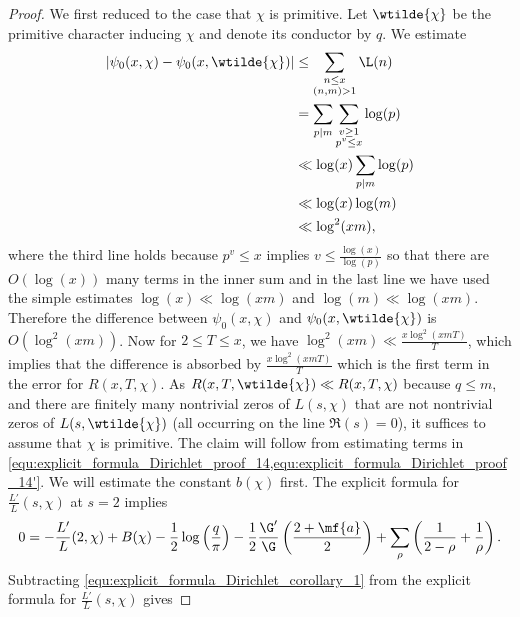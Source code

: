       \begin{proof}
        We first reduced to the case that $\chi$ is primitive. Let $\wtilde{\chi}$ be the primitive character inducing $\chi$ and denote its conductor by $q$. We estimate
        \begin{equation}\label{equ:difference_between_Dirichlet-Chebychefs}
          \begin{aligned}
            |\psi_{0}(x,\chi)-\psi_{0}(x,\wtilde{\chi})| &\le \sum_{\substack{n \le x \\ (n,m) > 1}}\L(n) \\
            &= \sum_{p \mid m}\sum_{\substack{v \ge 1 \\ p^{v} \le x}}\log(p) \\
            &\ll \log(x)\sum_{p \mid m}\log(p) \\
            &\ll \log(x)\log(m) \\
            &\ll \log^{2}(xm),
          \end{aligned}
        \end{equation}
        where the third line holds because $p^{v} \le x$ implies $v \le \frac{\log(x)}{\log(p)}$ so that there are $O(\log(x))$ many terms in the inner sum and in the last line we have used the simple estimates $\log(x) \ll \log(xm)$ and $\log(m) \ll \log(xm)$. Therefore the difference between $\psi_{0}(x,\chi)$ and $\psi_{0}(x,\wtilde{\chi})$ is $O(\log^{2}(xm))$. Now for $2 \le T \le x$, we have $\log^{2}(xm) \ll \frac{x\log^{2}(xmT)}{T}$, which implies that the difference is absorbed by $\frac{x\log^{2}(xmT)}{T}$ which is the first term in the error for $R(x,T,\chi)$. As $R(x,T,\wtilde{\chi}) \ll R(x,T,\chi)$ because $q \le m$, and there are finitely many nontrivial zeros of $L(s,\chi)$ that are not nontrivial zeros of $L(s,\wtilde{\chi})$ (all occurring on the line $\Re(s) = 0$), it suffices to assume that $\chi$ is primitive. The claim will follow from estimating terms in \cref{equ:explicit_formula_Dirichlet_proof_14,equ:explicit_formula_Dirichlet_proof_14'}. We will estimate the constant $b(\chi)$ first. The explicit formula for $\frac{L'}{L}(s,\chi)$ at $s = 2$ implies
        \begin{equation}\label{equ:explicit_formula_Dirichlet_corollary_1}
          0 = -\frac{L'}{L}(2,\chi)+B(\chi)-\frac{1}{2}\log\left(\frac{q}{\pi}\right)-\frac{1}{2}\frac{\G'}{\G}\left(\frac{2+\mf{a}}{2}\right)+\sum_{\rho}\left(\frac{1}{2-\rho}+\frac{1}{\rho}\right).
        \end{equation}
        Subtracting \cref{equ:explicit_formula_Dirichlet_corollary_1} from the explicit formula for $\frac{L'}{L}(s,\chi)$ gives

\end{proof}

